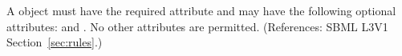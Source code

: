 A \RateRule object must have the required attribute 
 and may have the following optional attributes:
 and .  No other attributes are permitted.  
(References: SBML L3V1 Section~\ref{sec:rules}.)

